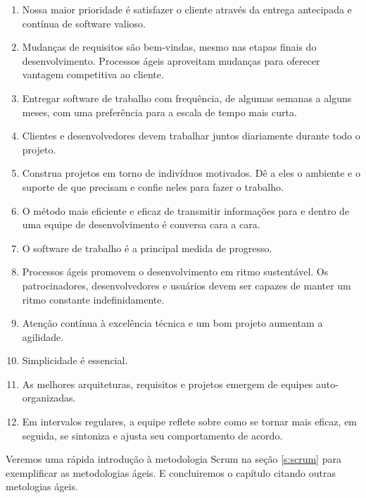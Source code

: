 \documentclass[
	11pt,				%
	openright,
	twoside,			%
	a4paper,			%
	english,			%
	french,
	brazil,				%
	sumario=tradicional
	]{abntex2}
\begin{document}
\begin{enumerate}
\item 
Nossa maior prioridade é satisfazer o cliente através da entrega antecipada e contínua de software valioso.

\item
Mudanças de requisitos são bem-vindas, mesmo nas etapas finais do desenvolvimento. Processos ágeis aproveitam mudanças para oferecer vantagem competitiva ao cliente.

\item
Entregar software de trabalho com frequência, de algumas semanas a alguns meses, com uma preferência para a escala de tempo mais curta.

\item
Clientes e desenvolvedores devem trabalhar juntos diariamente durante todo o projeto.

\item
Construa projetos em torno de indivíduos motivados. Dê a eles o ambiente e o suporte de que precisam e confie neles para fazer o trabalho.

\item
O método mais eficiente e eficaz de transmitir informações para e dentro de uma equipe de desenvolvimento é conversa cara a cara.

\item
O software de trabalho é a principal medida de progresso.

\item
Processos ágeis promovem o desenvolvimento em ritmo sustentável. Os patrocinadores, desenvolvedores e usuários devem ser capazes de manter um ritmo constante indefinidamente.

\item
Atenção contínua à excelência técnica e um bom projeto aumentam a agilidade.

\item
Simplicidade é essencial.

\item
As melhores arquiteturas, requisitos e projetos emergem de equipes auto-organizadas.

\item
Em intervalos regulares, a equipe reflete sobre como se tornar mais eficaz, em seguida, se sintoniza e ajusta seu comportamento de acordo.
\end{enumerate}

Veremos uma rápida introdução à metodologia Scrum na seção \ref{s:scrum} para exemplificar as metodologias ágeis. E concluiremos o capítulo citando outras metologias ágeis.
\end{document}
